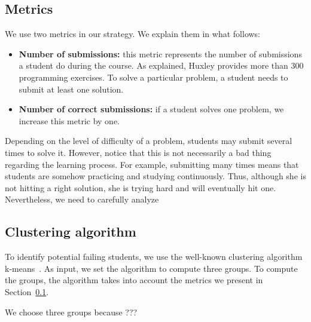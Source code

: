 \subsection{Metrics}

\label{sec:metrics}

We use two metrics in our strategy. We explain them in what follows:

\begin{itemize}

	\item \textbf{Number of submissions:} this metric represents the number of submissions a student do during the course. As explained, Huxley provides more than 300 programming exercises. To solve a particular problem, a student needs to submit at least one solution.

	\item \textbf{Number of correct submissions:} if a student solves one problem, we increase this metric by one.

\end{itemize}

Depending on the level of difficulty of a problem, students may submit several times to solve it. However, notice that this is not necessarily a bad thing regarding the learning process. For example, submitting many times means that students are somehow practicing and studying continuously. Thus, although she is not hitting a right solution, she is trying hard and will eventually hit one. Nevertheless, we need to carefully analyze \todots


\subsection{Clustering algorithm}

To identify potential failing students, we use the well-known clustering algorithm k-means~\cite{}. As input, we set the algorithm to compute three groups. To compute the groups, the algorithm takes into account the metrics we present in Section~\ref{sec:metrics}.

We choose three groups because ???




